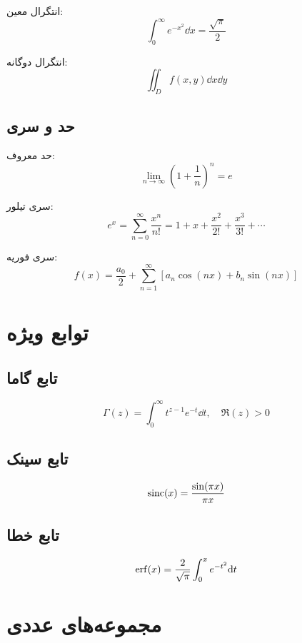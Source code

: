 \documentclass{matinbook}
\begin{document}
    انتگرال معین:
    \[
    \int_{0}^{\infty} e^{-x^{2}} \dd{x} = \frac{\sqrt{\pi}}{2}
    \]
    
    انتگرال دوگانه:
    \[
    \iint_{D} f(x, y) \dd{x}\dd{y}
    \]
    
    \section{حد و سری}
    
    حد معروف:
    \[
    \lim_{n \to \infty} \left(1 + \frac{1}{n}\right)^{n} = e
    \]
    
    سری تیلور:
    \[
    e^{x} = \sum_{n=0}^{\infty} \frac{x^{n}}{n!}
    = 1 + x + \frac{x^{2}}{2!} + \frac{x^{3}}{3!} + \cdots
    \]
    
    سری فوریه:
    \[
    f(x) = \frac{a_{0}}{2} + \sum_{n=1}^{\infty}
    \left[ a_{n} \cos(nx) + b_{n} \sin(nx) \right]
    \]
    
    \chapter{توابع ویژه}
    
    \section{تابع گاما}
    
    \[
    \Gamma(z) = \int_{0}^{\infty} t^{z-1} e^{-t} \dd{t}, \quad \Re(z) > 0
    \]
    
    \section{تابع سینک}
    
    \[
    \operatorname{sinc}(x) = \frac{\sin(\pi x)}{\pi x}
    \]
    
    \section{تابع خطا}
    
    \[
    \operatorname{erf}(x) = \frac{2}{\sqrt{\pi}} \int_{0}^{x} e^{-t^{2}} \mathrm{d}t
    \]
    
    \chapter{مجموعه‌های عددی}
    
\end{document}
